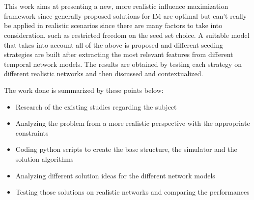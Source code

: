 \\
\\
This work aims at presenting a new, more realistic influence maximization framework since generally proposed solutions for IM are optimal but can’t really be applied in realistic scenarios since there are many factors to take into consideration, such as restricted freedom on the seed set choice. A suitable model that takes into account all of the above is proposed and different seeding strategies are built after extracting the most relevant features from different temporal network models. The results are obtained by testing each strategy on different realistic networks and then discussed and contextualized.

The work done is summarized by these points below:
\begin{itemize}
\item Research of the existing studies regarding the subject
\item Analyzing the problem from a more realistic perspective with the appropriate constraints
\item Coding python scripts to create the base structure, the simulator and the solution algorithms
\item Analyzing different solution ideas for the different network models 
\item Testing those solutions on realistic networks and comparing the performances
\end{itemize}







